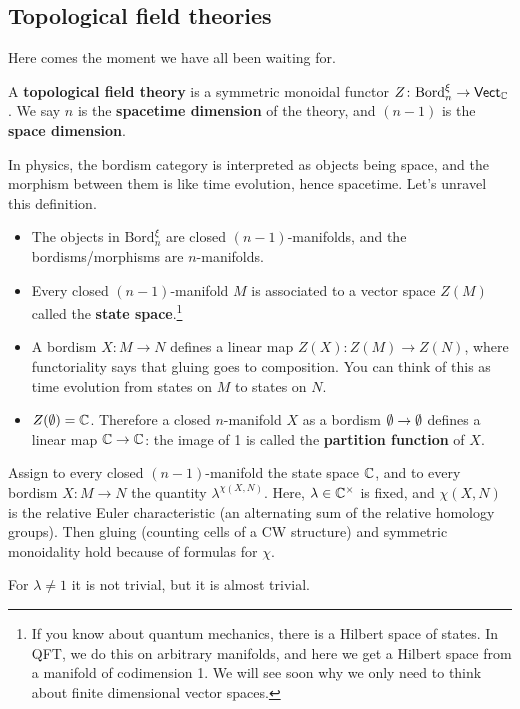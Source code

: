 \subsection*{Topological field theories}
Here comes the moment we have all been waiting for.
\begin{definition}[]
    A \textbf{topological field theory} is a symmetric monoidal functor $Z \colon \mathrm{Bord}_n ^{\xi}\to \mathsf{Vect} _{\mathbb{C}}$. We say $n$ is the \textbf{spacetime dimension} of the theory, and $(n-1)$ is the \textbf{space dimension}. 
\end{definition}
In physics, the bordism category is interpreted as objects being space, and the morphism between them is like time evolution, hence spacetime.
Let's unravel this definition.
\begin{itemize}
\setlength\itemsep{-.2em}
    \item The objects in $\mathrm{Bord}_n ^{\xi}$ are closed $(n-1)$-manifolds, and the bordisms/morphisms are $n$-manifolds. 
    \item Every closed $(n-1)$-manifold $M$ is associated to a vector space $Z(M)$ called the \textbf{state space}.\footnote{If you know about quantum mechanics, there is a Hilbert space of states. In QFT, we do this on arbitrary manifolds, and here we get a Hilbert space from a manifold of codimension 1. We will see soon why we only need to think about finite dimensional vector spaces.}
    \item A bordism $X \colon M \to N$ defines a linear map $Z(X) \colon Z(M) \to Z(N)$, where functoriality says that gluing goes to composition. You can think of this as time evolution from states on $M$ to states on $N$.
    \item $Z(\emptyset)=\mathbb{C}$. Therefore a closed $n$-manifold $X$ as a bordism $\emptyset \to \emptyset $ defines a linear map $\mathbb{C} \to \mathbb{C}$: the image of 1 is called the \textbf{partition function} of $X$.
\end{itemize}

\begin{example}
    Assign to every closed $(n-1)$-manifold the state space $\mathbb{C}$, and to every bordism $X \colon M \to N$ the quantity $\lambda^{\chi (X,N)}$. Here, $\lambda\in \mathbb{C}^{\times }$ is fixed, and $\chi(X,N)$ is the relative Euler characteristic (an alternating sum of the relative homology groups). Then gluing (counting cells of a CW structure) and symmetric monoidality hold because of formulas for $\chi$.

    For $\lambda\neq 1$ it is not trivial, but it is almost trivial.
\end{example}

